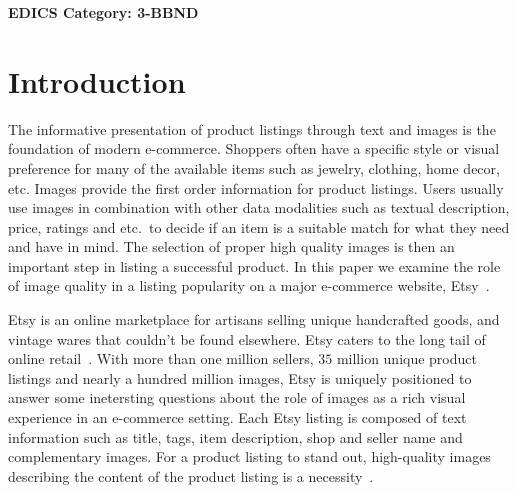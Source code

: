 \documentclass[conference,a4paper]{IEEEtran}
\newcommand{\etc}{etc.~}
\begin{document}




\ifCLASSOPTIONpeerreview
 \begin{center} \bfseries EDICS Category: 3-BBND \end{center}
 \fi
%
\IEEEpeerreviewmaketitle



\section{Introduction}
The informative presentation of product listings through text and 
images is the foundation of modern e-commerce. Shoppers often have a 
specific style or visual preference for many of the available items such as jewelry, clothing, home decor, etc. 
Images provide the first order information for product listings. 
Users usually use images in combination with other data modalities such as textual description, price, ratings and \etc to decide if an item is a suitable match for what they need and have in mind. The selection of proper high quality images is then an important step in listing a successful product. In this paper we examine the role of image quality in a listing popularity on a major e-commerce website, Etsy~.



Etsy is an online marketplace for artisans selling unique handcrafted goods, and vintage wares that
couldn't be found elsewhere. Etsy caters to the long tail of online retail~\cite{Anderson:2006,aryafar2014exploring}. With more than one million sellers, $35$ million unique product listings and nearly a hundred million images, Etsy is uniquely positioned to answer some inetersting questions about the role of images as a rich visual experience in an e-commerce setting. Each Etsy listing is composed of text information such as title, tags, item description, shop and seller name and complementary images. For a product listing to stand out, high-quality images describing the content of the product listing is a necessity~\cite{wang2011aesthetics,obrador2009role}. 
\end{document}
